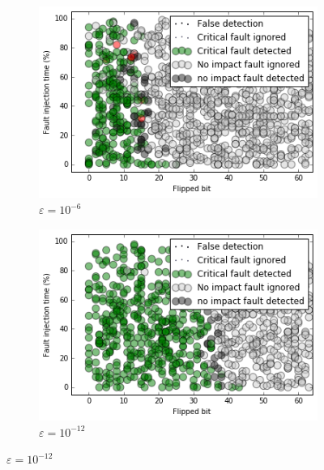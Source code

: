 \documentclass[twoside]{article}
\newcounter{fig}\setcounter{fig}{0}
\begin{document}
\begin{figure}[H]
\begin{minipage}[b]{0.48\linewidth}
      \begin{subfigure}[t]{\linewidth}
        \centering
        \includegraphics[width=1.1\linewidth]{figures/test_result_c05_0_full.png}
        \caption{$\varepsilon = 10^{-6}$}\label{fig:test_result_c05_0_full}	
      \end{subfigure}
      \quad
      \begin{subfigure}[t]{\linewidth}
        \centering
        \includegraphics[width=1.1\linewidth]{figures/test_result_c05_1_full.png}
        \caption{$\varepsilon = 10^{-12}$}\label{fig:test_result_c05_1_full}	
      \end{subfigure}
    \end{minipage}
    \quad
    \begin{minipage}[b]{0.48\linewidth}
      

\end{minipage}
\end{figure}
\end{document}
